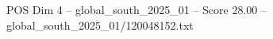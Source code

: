 \begin{textsample}{POS Dim 4 – global\_south\_2025\_01 – Score 28.00 – global\_south\_2025\_01/120048152.txt}
\end{textsample}
